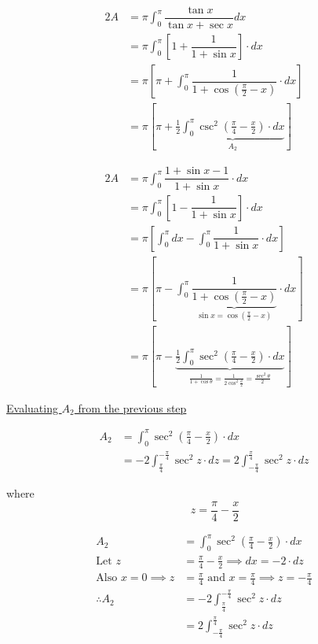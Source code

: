 \documentclass[14pt,fleqn]{extarticle}
\begin{document}
\newcard 

\begin{align}
2A &= \pi\int_0^\pi\dfrac{\tan x}{\tan x + \sec x}dx \\ 
&= \pi\int_0^\pi\left[1+\dfrac{1}{1+\sin x}\right]\cdot dx \\
&= \pi\left[\pi + \int_0^\pi\dfrac{1}{1+\cos \left(\frac{\pi}{2}-x\right)}\cdot dx\right] \\
&= \pi\left[\pi + \frac{1}{2}\underbrace{\int_0^\pi\csc^2\left(\frac{\pi}{4}-\frac{x}{2}\right)\cdot dx}_{A_2}\right]
\end{align}

\newcard 

\begin{align}
2A &= \pi\int_0^\pi\dfrac{1+\sin x-1}{1+\sin x}\cdot dx \\
&=\pi\int_0^\pi\left[1-\dfrac{1}{1+\sin x}\right]\cdot dx \\
&= \pi\left[\int_0^\pi dx -\int_0^\pi\dfrac{1}{1+\sin x}\cdot dx\right] \\
&= \pi\left[\pi - \int_0^\pi\dfrac{1}{\underbrace{1+\cos \left(\frac{\pi}{2}-x\right)}_{\sin x = \cos \left(\frac{\pi}{2}-x\right)}}\cdot dx\right] \\
&= \pi\left[\pi - \underbrace{\frac{1}{2}\int_0^\pi\sec^2\left(\frac{\pi}{4}-\frac{x}{2}\right)\cdot dx}_
{\frac{1}{1+\cos\theta} = \frac{1}{2\cos^2\frac{\theta}{2}} = \frac{\sec^2\theta}{2}}\right]
\end{align}

\newcard 

\underline{Evaluating $A_2$ from the previous step}

%
\begin{align}
A_2 &= \int_0^\pi\sec^2 \left(\frac\pi{4}-\frac{x}{2} \right)\cdot dx \\
&= -2\int_{\frac\pi{4}}^{-\frac\pi{4}}\sec^2 z\cdot dz = 2\int_{-\frac\pi{4}}^{\frac\pi{4}}\sec^2 z\cdot dz
\end{align}

where \[ \qquad z = \frac\pi{4}-\frac{x}{2} \] 
%

\newcard 

\begin{align}
A_2 &= \int_0^\pi\sec^2\left(\frac{\pi}{4}-\frac{x}{2}\right)\cdot dx \\
\text{Let } z &= \frac{\pi}{4}-\frac{x}{2}\implies dx = -2\cdot dz \\
\text{Also } x=0\implies z&=\frac\pi{4}\text{ and }x =\frac\pi{4}\implies z = -\frac\pi{4} \\
\therefore A_2 &= -2\int_{\frac{\pi}{4}}^{-\frac{\pi}{4}}\sec^2 z\cdot dz \\
&= 2\int_{-\frac{\pi}{4}}^{\frac{\pi}{4}}\sec^2 z\cdot dz 
\end{align}
\end{document}
